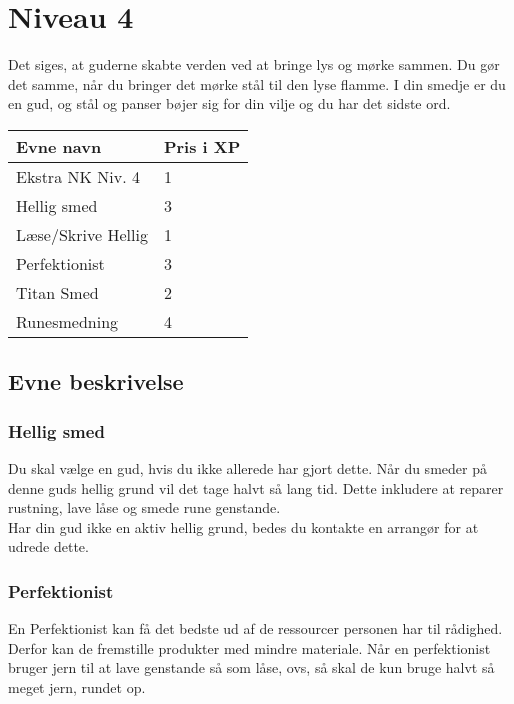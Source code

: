 \chapter{Niveau 4}
Det siges, at guderne skabte verden ved at bringe lys og mørke sammen. Du gør det samme, når du bringer det mørke stål til den lyse flamme. I din smedje er du en gud, og stål og panser bøjer sig for din vilje og du har det sidste ord.\\


\begin{tabular}{|p{}|p{}|}
\hline
\rowcolor{cerulean!40}
    Evne navn & Pris i XP\\ \hline
    Ekstra NK Niv. 4 & 1\\\hline
    Hellig smed & 3 \\\hline
    Læse/Skrive Hellig  & 1\\\hline
    Perfektionist & 3 \\\hline
    Titan Smed & 2 \\\hline
    Runesmedning   & 4\\\hline
\end{tabular}

\section{Evne beskrivelse}



\subsection{Hellig smed}
Du skal vælge en gud, hvis du ikke allerede har gjort dette. Når du smeder på denne guds hellig grund vil det tage halvt så lang tid. Dette inkludere at reparer rustning, lave låse og smede rune genstande.\\
Har din gud ikke en aktiv hellig grund, bedes du kontakte en arrangør for at udrede dette.



\subsection{Perfektionist}
En Perfektionist kan få det bedste ud af de ressourcer personen har til rådighed. Derfor kan de fremstille produkter med mindre materiale. Når en perfektionist bruger jern til at lave genstande så som låse, ovs, så skal de kun bruge halvt så meget jern, rundet op.\\

